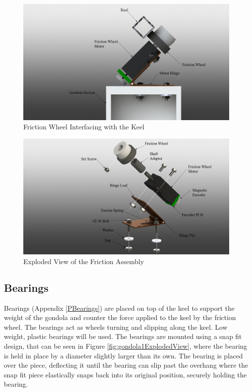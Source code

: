 \documentclass[../main.tex]{subfiles}
\begin{document}
\begin{figure}[H]
	\centering
	\includegraphics[width=.8\linewidth]{img/design/gondola/frictionWheelOnGondola.png}
	\caption{Friction Wheel Interfacing with the Keel}
		\label{fig:frictionWheelOnGondola}
\end{figure}
\begin{figure}[H]
	\centering
	\includegraphics[width=.8\linewidth]{img/design/gondola/explodedFrictionWheel.png}
	\caption{Exploded View of the Friction Assembly}
	\label{fig:explodedFrictionWheel}
\end{figure}

\subsection{Bearings}
Bearings (Appendix \ref{PBearings}) are placed on top of the keel to support the weight of the gondola and counter the force applied to the keel by the friction wheel. The bearings act as wheels turning and slipping along the keel. Low weight, plastic bearings will be used. The bearings are mounted using a snap fit design, that can be seen in Figure \ref{fig:gondola1ExplodedView}, where the bearing is held in place by a diameter slightly larger than its own. The bearing is placed over the piece, deflecting it until the bearing can slip past the overhang where the snap fit piece elastically snaps back into its original position, securely holding the bearing.
\\
\end{document}
